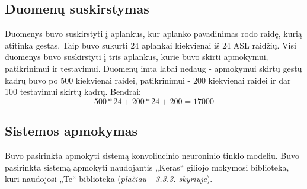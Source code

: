 \documentclass{VUMIFInfKursinis}
\begin{document}
\subsection{Duomenų suskirstymas}

Duomenys buvo suskirstyti į aplankus, kur aplanko pavadinimas rodo raidę, kurią atitinka gestas. Taip buvo sukurti 24 aplankai kiekvienai iš 24 ASL raidžių. Visi duomenys buvo suskirstyti į tris aplankus, kurie buvo skirti apmokymui, patikrinimui ir testavimui. Duomenų imta labai nedaug - apmokymui skirtų gestų kadrų buvo po 500 kiekvienai raidei, patikrinimui - 200 kiekvienai raidei ir dar 100 testavimui skirtų kadrų. Bendrai: 
\begin{equation}
	500*24+200*24+200=17000
\end{equation}

\subsection{Sistemos apmokymas}
Buvo pasirinkta apmokyti sistemą konvoliucinio neuroninio tinklo modeliu. Buvo pasirinkta sistemą apmokyti naudojantis „Keras“ giliojo mokymosi biblioteka, kuri naudojosi „Te“ biblioteka (\textit{plačiau - 3.3.3. skyriuje}).



\end{document}
